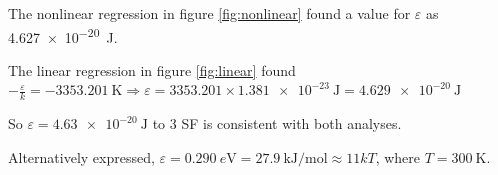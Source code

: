 \documentclass[a4paper,11pt]{article}
\begin{document}
The nonlinear regression in figure \ref{fig:nonlinear} found a value for
$\varepsilon$ as \SI{4.627e-20}{\joule}.

The linear regression in figure \ref{fig:linear} found
$-\frac{\varepsilon}{k} = \SI{-3353.201}{\kelvin}
\Rightarrow \varepsilon = 3353.201 \times \SI{1.381e-23}{\joule}
= \SI{4.629e-20}{\joule}
$

So $\varepsilon = \SI{4.63e-20}{\joule}$ to 3 SF is consistent with both
analyses.

Alternatively expressed,
$\varepsilon = \SI{0.290}{e\volt} = \SI{27.9}{\kilo\joule\per\mol}
             \approx 11kT$, where
$T = \SI{300}{\kelvin}$.
\end{document}
